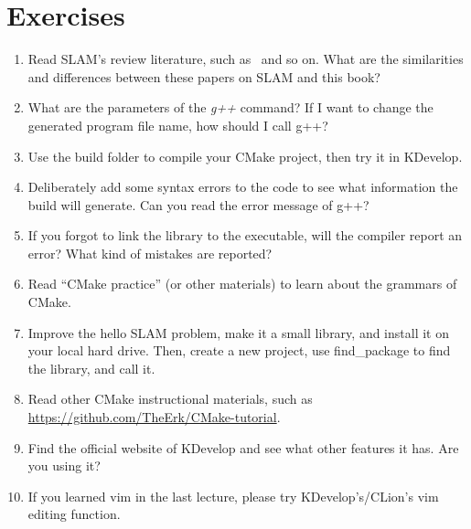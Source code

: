 \section*{Exercises}
\begin{enumerate}
    \item[\optional] Read SLAM's review literature, such as~\cite{Cadena2016, Fuentes-Pacheco2015, Boal2014, Chen2012, Chen2007} and so on. What are the similarities and differences between these papers on SLAM and this book?
    \item What are the parameters of the \textit{g++} command? If I want to change the generated program file name, how should I call g++?
    \item Use the build folder to compile your CMake project, then try it in KDevelop.
    \item Deliberately add some syntax errors to the code to see what information the build will generate. Can you read the error message of g++?
    \item If you forgot to link the library to the executable, will the compiler report an error? What kind of mistakes are reported?
    \item[\optional] Read ``CMake practice'' (or other materials) to learn about the grammars of CMake.
    \item[\optional] Improve the hello SLAM problem, make it a small library, and install it on your local hard drive. Then, create a new project, use find\_package to find the library, and call it.
    \item[\optional] Read other CMake instructional materials, such as \url{https://github.com/TheErk/CMake-tutorial}.
    \item Find the official website of KDevelop and see what other features it has. Are you using it?
    \item If you learned vim in the last lecture, please try KDevelop's/CLion's vim editing function.
\end{enumerate}
